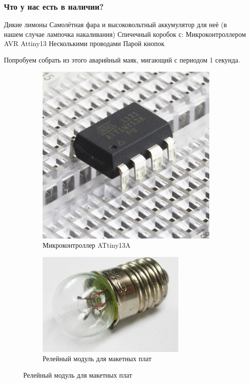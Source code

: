 \documentclass[aspectratio=169, pdf, 8pt, unicode]{beamer}
\begin{document}
\begin{frame}[fragile]
\frametitle{Что у нас есть в наличии?}
	\begin{outline}
		\1 Дикие лимоны
		\1 Самолётная фара и высоковольтный аккумулятор для неё (в нашем случае лампочка накаливания)
		\1 Спичечный коробок с:
			\2 { \normalsize Микроконтроллером AVR Attiny13 }
			\2 { \normalsize Несколькими проводами }
			\2 { \normalsize Парой кнопок }
	\end{outline}
	Попробуем собрать из этого аварийный маяк, мигающий с периодом 1 секунда.
	\begin{figure}[H]
		\begin{subfigure}{0.25\textwidth}
			\centering
			\includegraphics[width=\textwidth]{resources/attiny13a.JPG}
			\caption{Микроконтроллер ATtiny13A}
		\end{subfigure}
		\begin{subfigure}{0.35\textwidth}
			\centering
			\includegraphics[width=\textwidth]{resources/lamp.jpg}
			\caption{Релейный модуль для макетных плат}
		\end{subfigure}
	\end{figure}
\end{frame}
\end{document}
